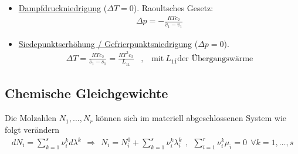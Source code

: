 \vspace{-5pt}

\begin{itemize}
    \item \underline{Dampfdruckniedrigung} ($\Delta T = 0$). Raoultsches Gesetz:
        \begin{align*}
            \Delta p = - \frac{R T c_2}{\overline{v}_1 - v_1}
        \end{align*}
        \vspace{-18pt}
    \item \underline{Siedepunktserhöhung / Gefrierpunktsniedrigung} ($\Delta p = 0$).
        \begin{align*}
            \Delta T = \frac{R T c_2}{\overline{s}_1 - s_1} = \frac{R T^2 c_2}{L_{1\overline{1}}}
            \hspace{10pt} , \hspace{10pt} \text{mit} \ L_{1 \overline{1}} \text{der Übergangswärme}
        \end{align*}
\end{itemize}

\vspace{-10pt}

\subsection{Chemische Gleichgewichte}

Die Molzahlen $N_1,\dots,N_r$ können sich im materiell abgeschlossenen System
wie folgt verändern
\begin{align*}
    d N_i = \sum_{k=1}^s \nu_i^k d \lambda^k
    \hspace{5pt} \Rightarrow \hspace{5pt}
    N_i = N_i^0 + \sum_{k=1}^s \nu_i^k \lambda_i^k
    \hspace{5pt} , \hspace{5pt}
    \sum_{i=1}^r \nu_i^k \mu_i = 0 \ \ \forall k = 1,\dots,s
\end{align*}

